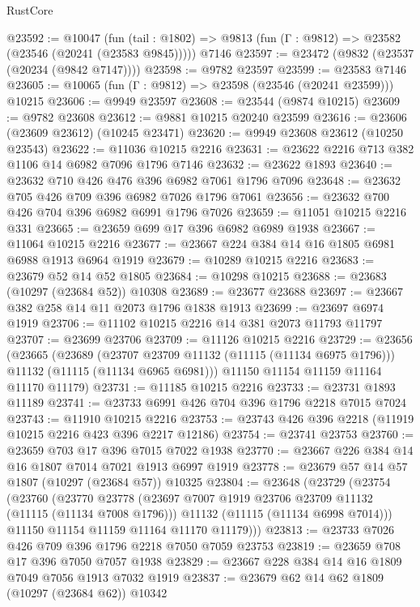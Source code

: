 \begin{lexlean}{RustCore}
\begin{coremodule}
@23592 := @10047
    (fun (tail : @1802) => @9813 (fun (Γ : @9812) => @23582 (@23546 (@20241 (@23583 @9845)))))
    @7146
@23597 := @23472 (@9832 (@23537 (@20234 (@9842 @7147))))
@23598 := @9782 @23597
@23599 := @23583 @7146
@23605 := @10065 (fun (Γ : @9812) => @23598 (@23546 (@20241 @23599))) @10215
@23606 := @9949 @23597
@23608 := @23544 (@9874 @10215)
@23609 := @9782 @23608
@23612 := @9881 @10215 @20240 @23599
@23616 := @23606 (@23609 @23612) (@10245 @23471)
@23620 := @9949 @23608 @23612 (@10250 @23543)
@23622 := @11036 @10215 @2216
@23631 := @23622 @2216 @713 @382 @1106 @14 @6982 @7096 @1796 @7146
@23632 := @23622 @1893
@23640 := @23632 @710 @426 @476 @396 @6982 @7061 @1796 @7096
@23648 := @23632 @705 @426 @709 @396 @6982 @7026 @1796 @7061
@23656 := @23632 @700 @426 @704 @396 @6982 @6991 @1796 @7026
@23659 := @11051 @10215 @2216 @331
@23665 := @23659 @699 @17 @396 @6982 @6989 @1938
@23667 := @11064 @10215 @2216
@23677 := @23667 @224 @384 @14 @16 @1805 @6981 @6988 @1913 @6964 @1919
@23679 := @10289 @10215 @2216
@23683 := @23679 @52 @14 @52 @1805
@23684 := @10298 @10215
@23688 := @23683 (@10297 (@23684 @52)) @10308
@23689 := @23677 @23688
@23697 := @23667 @382 @258 @14 @11 @2073 @1796 @1838 @1913
@23699 := @23697 @6974 @1919
@23706 := @11102 @10215 @2216 @14 @381 @2073 @11793 @11797
@23707 := @23699 @23706
@23709 := @11126 @10215 @2216
@23729 := @23656
    (@23665
      (@23689
        (@23707 @23709 @11132 (@11115 (@11134 @6975 @1796)))
        @11132
        (@11115 (@11134 @6965 @6981)))
      @11150
      @11154
      @11159
      @11164
      @11170
      @11179)
@23731 := @11185 @10215 @2216
@23733 := @23731 @1893 @11189
@23741 := @23733 @6991 @426 @704 @396 @1796 @2218 @7015 @7024
@23743 := @11910 @10215 @2216
@23753 := @23743 @426 @396 @2218 (@11919 @10215 @2216 @423 @396 @2217 @12186)
@23754 := @23741 @23753
@23760 := @23659 @703 @17 @396 @7015 @7022 @1938
@23770 := @23667 @226 @384 @14 @16 @1807 @7014 @7021 @1913 @6997 @1919
@23778 := @23679 @57 @14 @57 @1807 (@10297 (@23684 @57)) @10325
@23804 := @23648
    (@23729
      (@23754
        (@23760
          (@23770
            @23778
            (@23697 @7007 @1919 @23706 @23709 @11132 (@11115 (@11134 @7008 @1796)))
            @11132
            (@11115 (@11134 @6998 @7014)))
          @11150
          @11154
          @11159
          @11164
          @11170
          @11179)))
@23813 := @23733 @7026 @426 @709 @396 @1796 @2218 @7050 @7059 @23753
@23819 := @23659 @708 @17 @396 @7050 @7057 @1938
@23829 := @23667 @228 @384 @14 @16 @1809 @7049 @7056 @1913 @7032 @1919
@23837 := @23679 @62 @14 @62 @1809 (@10297 (@23684 @62)) @10342

\end{coremodule}
\end{lexlean}
